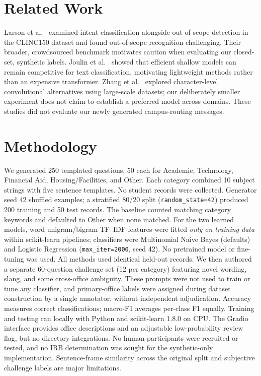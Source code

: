 \documentclass[sigconf,anonymous]{acmart}
\begin{document}
\section{Related Work}
Larson et al.\ \cite{larson2019} examined intent classification alongside out-of-scope detection in the CLINC150 dataset and found out-of-scope recognition challenging. Their broader, crowdsourced benchmark motivates caution when evaluating our closed-set, synthetic labels. Joulin et al.\ \cite{joulin2017} showed that efficient shallow models can remain competitive for text classification, motivating lightweight methods rather than an expensive transformer. Zhang et al.\ \cite{zhang2015} explored character-level convolutional alternatives using large-scale datasets; our deliberately smaller experiment does not claim to establish a preferred model across domains. These studies did not evaluate our newly generated campus-routing messages.
\section{Methodology}
We generated 250 templated questions, 50 each for Academic, Technology, Financial Aid, Housing/Facilities, and Other. Each category combined 10 subject strings with five sentence templates. No student records were collected. Generator seed 42 shuffled examples; a stratified 80/20 split (\texttt{random\_state=42}) produced 200 training and 50 test records. The baseline counted matching category keywords and defaulted to Other when none matched. For the two learned models, word unigram/bigram TF--IDF features were fitted \emph{only on training data} within scikit-learn pipelines; classifiers were Multinomial Naive Bayes (defaults) and Logistic Regression (\texttt{max\_iter=2000}, seed 42). No pretrained model or fine-tuning was used. All methods used identical held-out records. We then authored a separate 60-question challenge set (12 per category) featuring novel wording, slang, and some cross-office ambiguity. These prompts were not used to train or tune any classifier, and primary-office labels were assigned during dataset construction by a single annotator, without independent adjudication. Accuracy measures correct classifications; macro-F1 averages per-class F1 equally. Training and testing ran locally with Python and scikit-learn 1.8.0 on CPU. The Gradio interface provides office descriptions and an adjustable low-probability review flag, but no directory integrations. No human participants were recruited or tested, and no IRB determination was sought for the synthetic-only implementation. Sentence-frame similarity across the original split and subjective challenge labels are major limitations.
\end{document}
